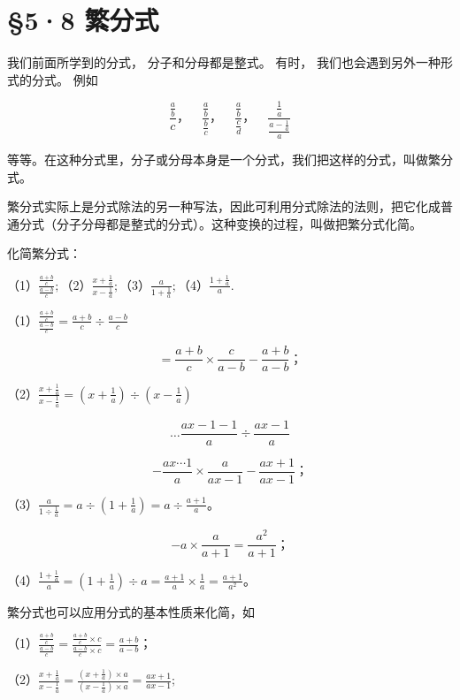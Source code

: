 \section{§5·8 繁分式}

我们前面所学到的分式， 分子和分母都是整式。 有时，
我们也会遇到另外一种形式的分式。 例如

\[
\frac{\frac{a}{b}}{c}\text{，} \quad \frac{\frac{a}{b}}{\frac{b}{c}}\text{，} \quad \frac{\frac{a}{b}}{\frac{c}{d}}\text{，} \quad \frac{\frac{1}{a}}{\frac{a - \frac{1}{a}}{a}}
\]

等等。在这种分式里，分子或分母本身是一个分式，我们把这样的分式，叫做繁分式。

繁分式实际上是分式除法的另一种写法，因此可利用分式除法的法则，把它化成普通分式（分子分母都是整式的分式）。这种变换的过程，叫做把繁分式化简。

 化简繁分式：

（1）\(\frac{\frac{a + b}{c}}{\frac{a - b}{c}};\)（2）\(\frac{x + \frac{1}{a}}{x - \frac{1}{a}};\)（3）\(\frac{a}{1 + \frac{1}{a}};\)（4）\(\frac{1 + \frac{1}{a}}{a}.\)

（1）\(\frac{\frac{a + b}{c}}{\frac{a - b}{c}} = \frac{a + b}{c} \div \frac{a - b}{c}\)

\[
= \frac{a + b}{c} \times \frac{c}{a - b} - \frac{a + b}{a - b}\text{；}
\]

（2）\(\frac{x + \frac{1}{a}}{x - \frac{1}{a}} = (x + \frac{1}{a}) \div (x - \frac{1}{a})\)

\[
\dots \frac{a x - 1 - 1}{a} \div \frac{a x - 1}{a}
\]

\[
- \frac{a x \cdots 1}{a} \times \frac{a}{a x - 1} - \frac{a x + 1}{a x - 1}\text{；}
\]

（3）\(\frac{a}{1 \div \frac{1}{a}} = a \div \left(1 + \frac{1}{a}\right) = a \div \frac{a + 1}{a}\)。

\[
- a \times \frac{a}{a + 1} = \frac{a ^{2}}{a + 1}\text{；}
\]

（4）\(\frac{1 + \frac{1}{a}}{a} = \left(1 + \frac{1}{a}\right) \div a = \frac{a + 1}{a} \times \frac{1}{a} = \frac{a + 1}{a^2}\)。

繁分式也可以应用分式的基本性质来化简，如

（1）\(\frac{\frac{a + b}{c}}{\frac{a - b}{c}} = \frac{\frac{a + b}{c} \times c}{\frac{a - b}{c} \times c} = \frac{a + b}{a - b}\)；

（2）\(\frac{x + \frac{1}{a}}{x - \frac{1}{a}} = \frac{(x + \frac{1}{a}) \times a}{(x - \frac{1}{a}) \times a} = \frac{ax + 1}{ax - 1};\)


